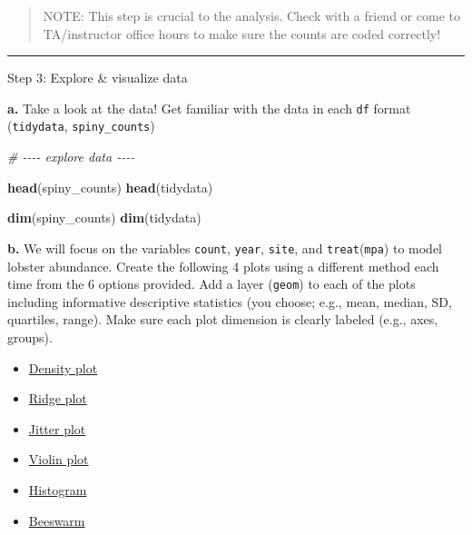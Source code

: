 \documentclass[
]{article}
\newenvironment{Shaded}{\begin{snugshade}}{\end{snugshade}}
\newcommand{\CommentTok}[1]{\textcolor[rgb]{0.56,0.35,0.01}{\textit{#1}}}
\newcommand{\FunctionTok}[1]{\textcolor[rgb]{0.13,0.29,0.53}{\textbf{#1}}}
\newcommand{\NormalTok}[1]{#1}
\providecommand{\tightlist}{%
  \setlength{\itemsep}{0pt}\setlength{\parskip}{0pt}}
\begin{document}
\begin{quote}
NOTE: This step is crucial to the analysis. Check with a friend or come
to TA/instructor office hours to make sure the counts are coded
correctly!
\end{quote}

\begin{center}\rule{0.5\linewidth}{0.5pt}\end{center}

Step 3: Explore \& visualize data

\textbf{a.} Take a look at the data! Get familiar with the data in each
\texttt{df} format (\texttt{tidydata}, \texttt{spiny\_counts})

\begin{Shaded}
\begin{Highlighting}[]
\CommentTok{\# {-}{-}{-}{-} explore data {-}{-}{-}{-}}

\FunctionTok{head}\NormalTok{(spiny\_counts)}
\FunctionTok{head}\NormalTok{(tidydata)}

\FunctionTok{dim}\NormalTok{(spiny\_counts)}
\FunctionTok{dim}\NormalTok{(tidydata)}
\end{Highlighting}
\end{Shaded}

\textbf{b.} We will focus on the variables \texttt{count},
\texttt{year}, \texttt{site}, and \texttt{treat}(\texttt{mpa}) to model
lobster abundance. Create the following 4 plots using a different method
each time from the 6 options provided. Add a layer (\texttt{geom}) to
each of the plots including informative descriptive statistics (you
choose; e.g., mean, median, SD, quartiles, range). Make sure each plot
dimension is clearly labeled (e.g., axes, groups).

\begin{itemize}
\tightlist
\item
  \href{https://r-charts.com/distribution/density-plot-group-ggplot2}{Density
  plot}
\item
  \href{https://r-charts.com/distribution/ggridges/}{Ridge plot}
\item
  \href{https://ggplot2.tidyverse.org/reference/geom_jitter.html}{Jitter
  plot}
\item
  \href{https://r-charts.com/distribution/violin-plot-group-ggplot2}{Violin
  plot}
\item
  \href{https://r-charts.com/distribution/histogram-density-ggplot2/}{Histogram}
\item
  \href{https://r-charts.com/distribution/beeswarm/}{Beeswarm}
\end{itemize}
\end{document}
